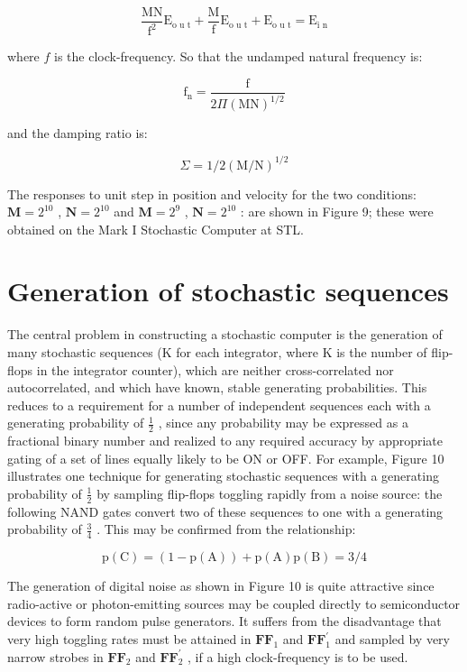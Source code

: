 \documentclass[
  10
]{article}
\begin{document}
\[
\frac {\mathrm {M N}}{\mathrm {f} ^ {2}} \mathrm {E} _ {\text {o u t}} + \frac {\mathrm {M}}{\mathrm {f}} \mathrm {E} _ {\text {o u t}} + \mathrm {E} _ {\text {o u t}} = \mathrm {E} _ {\text {i n}} \tag {29}
\]

where \(f\) is the clock-frequency. So that the undamped natural
frequency is:

\[
\mathrm {f} _ {\mathrm {n}} = \frac {\mathrm {f}}{2 \Pi (\mathrm {M N}) ^ {1 / 2}} \tag {30}
\]

and the damping ratio is:

\[
\Sigma = 1 / 2 (\mathrm {M} / \mathrm {N}) ^ {1 / 2} \tag {31}
\]

The responses to unit step in position and velocity for the two
conditions: \(\mathbf{M} = 2^{10}\) , \(\mathbf{N} = 2^{10}\) and
\(\mathbf{M} = 2^{9}\) , \(\mathbf{N} = 2^{10}\) : are shown in Figure
9; these were obtained on the Mark I Stochastic Computer at STL.

\section{Generation of stochastic
sequences}\label{generation-of-stochastic-sequences}

The central problem in constructing a stochastic computer is the
generation of many stochastic sequences (K for each integrator, where K
is the number of flip-flops in the integrator counter), which are
neither cross-correlated nor autocorrelated, and which have known,
stable generating probabilities. This reduces to a requirement for a
number of independent sequences each with a generating probability of
\(\frac{1}{2}\) , since any probability may be expressed as a fractional
binary number and realized to any required accuracy by appropriate
gating of a set of lines equally likely to be ON or OFF. For example,
Figure 10 illustrates one technique for generating stochastic sequences
with a generating probability of \(\frac{1}{2}\) by sampling flip-flops
toggling rapidly from a noise source: the following NAND gates convert
two of these sequences to one with a generating probability of
\(\frac{3}{4}\) . This may be confirmed from the relationship:

\[
\mathrm {p} (\mathrm {C}) = (1 - \mathrm {p} (\mathrm {A})) + \mathrm {p} (\mathrm {A}) \mathrm {p} (\mathrm {B}) = 3 / 4 \tag {32}
\]

The generation of digital noise as shown in Figure 10 is quite
attractive since radio-active or photon-emitting sources may be coupled
directly to semiconductor devices to form random pulse generators. It
suffers from the disadvantage that very high toggling rates must be
attained in \(\mathbf{F}\mathbf{F}_1\) and
\(\mathbf{F}\mathbf{F}_1^{\prime}\) and sampled by very narrow strobes
in \(\mathbf{F}\mathbf{F}_2\) and \(\mathbf{F}\mathbf{F}_2^{\prime}\) ,
if a high clock-frequency is to be used.
\end{document}
